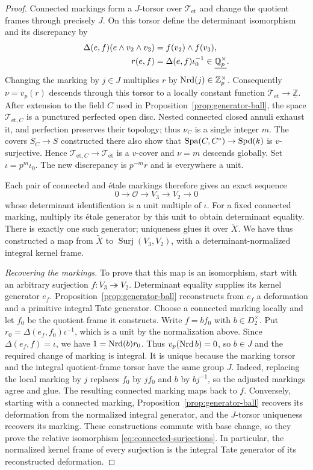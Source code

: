 \begin{proof}
Connected markings form a $J$-torsor over $\mathcal T_{\mathrm{et}}$ and change
the quotient frames through precisely $J$.  On this torsor define
the determinant isomorphism and its discrepancy by
\begin{align*}
 \Delta(e,f)(e\wedge v_2\wedge v_3)&=f(v_2)\wedge f(v_3),\\
 r(e,f)&=\Delta(e,f)\iota_0^{-1}\in\underline{\mathbb Q_p^\times}.
\end{align*}
Changing the marking by $j\in J$ multiplies $r$ by
$\operatorname{Nrd}(j)\in\mathbb Z_p^\times$.  Consequently
$\nu=v_p(r)$ descends through this torsor to a locally constant
function $\mathcal T_{\mathrm{et}}\to\underline{\mathbb Z}$.
After extension to the field $C$ used in
Proposition~\ref{prop:generator-ball}, the space $\mathcal T_{\mathrm{et},C}$
is a punctured perfected open disc.  Nested connected closed
annuli exhaust it, and perfection preserves their topology;
thus $\nu_C$ is a single integer $m$.
The covers $S_C\to S$ constructed there also show that
$\operatorname{Spa}(C,C^\circ)\to\operatorname{Spd}(k)$ is $v$-surjective.
Hence $\mathcal T_{\mathrm{et},C}\to\mathcal T_{\mathrm{et}}$ is a $v$-cover and
$\nu=m$ descends globally.  Set $\iota=p^m\iota_0$.
The new discrepancy is $p^{-m}r$ and is everywhere a unit.

Each pair of connected and étale markings therefore gives an exact
sequence
\[
 0\longrightarrow\mathcal O\longrightarrow V_3
       \longrightarrow V_2\longrightarrow0
\]
whose determinant identification is a unit multiple of $\iota$.
For a fixed connected marking, multiply its étale generator by this
unit to obtain determinant equality.  There is exactly one such
generator; uniqueness glues it over $\widetilde X$.  We have thus
constructed a map from $\widetilde X$ to $\operatorname{Surj}(V_3,V_2)$,
with a determinant-normalized integral kernel frame.

\smallskip\noindent\emph{Recovering the markings.}
To prove that this map is an isomorphism, start with an arbitrary
surjection $f:V_3\twoheadrightarrow V_2$.  Determinant equality supplies
its kernel generator $e_f$.  Proposition~\ref{prop:generator-ball}
reconstructs from $e_f$ a deformation and a primitive integral
Tate generator.  Choose a connected marking locally and let $f_0$
be the quotient frame it constructs.  Write $f=b f_0$ with
$b\in D_2^\times$.  Put $r_0=\Delta(e_f,f_0)\iota^{-1}$,
which is a unit by the normalization above.  Since
$\Delta(e_f,f)=\iota$, we have $1=\operatorname{Nrd}(b)r_0$.  Thus
$v_p(\operatorname{Nrd} b)=0$, so $b\in J$ and the required change of marking
is integral.  It is unique because the marking torsor and the
integral quotient-frame torsor have the same group $J$.
Indeed, replacing the local marking by $j$ replaces $f_0$ by
$jf_0$ and $b$ by $bj^{-1}$, so the adjusted markings agree
and glue.  The resulting connected marking maps back to $f$.
Conversely, starting with a connected marking,
Proposition~\ref{prop:generator-ball} recovers its deformation from the
normalized integral generator, and the $J$-torsor uniqueness recovers
its marking.  These constructions commute with base change,
so they prove the relative isomorphism \eqref{eq:connected-surjections}.
In particular, the normalized kernel frame of every surjection is
the integral Tate generator of its reconstructed deformation.


\end{proof}
